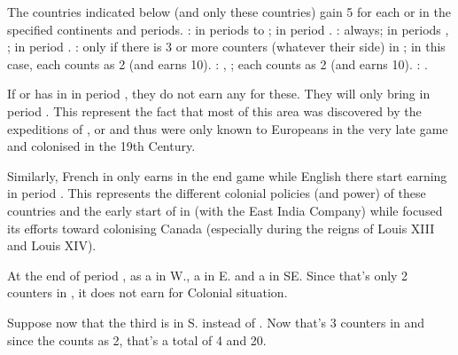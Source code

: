  The countries indicated below (and only these
countries) gain 5 \VPs for each \COL or \TP in the specified continents and
periods.
\bparag \ANG: \continentIndia in periods  to ;
\granderegionOceania in period .
\bparag \FRA: \continentAmerica always; \continentIndia in periods
, ; \granderegionOceania in period .
\bparag \POR: \continentAmerica only if there is 3 or more \POR \COL counters
(whatever their side) in \continentBrazil; in this case, each \COL\faceplus
counts as 2 \COL (and earns 10\VPs).
\bparag \RUS: \paysChine, \continentAmerica; each \COL\faceplus counts as 2
\COL (and earns 10\VPs).
\bparag \SUE: \continentAmerica.

\begin{designnote}
  If \ANG or \FRA has \COL in \granderegionOceania in period , they
  do not earn any \VPs for these. They will only bring \VPs in period
  . This represent the fact that most of this area was discovered
  by the expeditions of \leaderCook, \leaderBougainville or  and thus were only known to Europeans in the very late game and
  colonised in the 19th Century.

  Similarly, French \COL in \continentIndia only earns \VPs in the end game
  while English \COL there start earning \VPs in period . This
  represents the different colonial policies (and power) of these countries
  and the early start of \ANG in \continentIndia (with the East India Company)
  while \FRA focused its efforts toward colonising Canada (especially during
  the reigns of Louis XIII and Louis XIV).
\end{designnote}

\begin{exemple}
  At the end of period , \POR as a \COL\faceplus in
  \granderegionRecife W., a \COL \facemoins in \granderegionBelem E. and a
  \COL \facemoins in \granderegionAmazonia SE. Since that's only 2 \COL
  counters in \continentBrazil, it does not earn \VPs for Colonial situation.

  Suppose now that the third \COL is in \granderegionRio S. instead of
  \granderegionAmazonia. Now that's 3 counters in \continentBrazil and since
  the \COL\faceplus counts as 2, that's a total of 4 \COL and 20\VPs.
\end{exemple}

